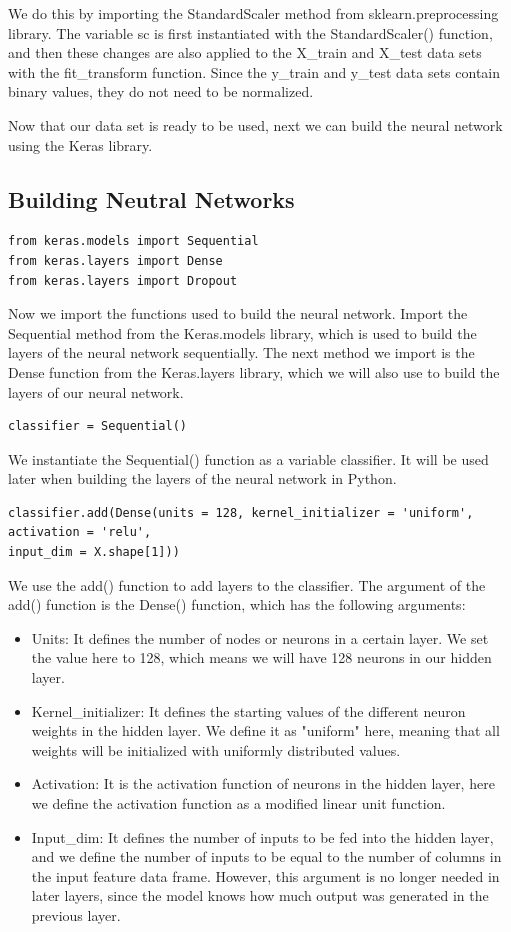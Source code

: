 \documentclass{article}
\begin{document}
We do this by importing the StandardScaler method from sklearn.preprocessing library. The variable sc is first instantiated with the StandardScaler() function, and then these changes are also applied to the X\_train and X\_test data sets with the fit\_transform function. Since the y\_train and y\_test data sets contain binary values, they do not need to be normalized.

Now that our data set is ready to be used, next we can build the neural network using the Keras library.

\subsection{Building Neutral Networks}
\begin{verbatim}
from keras.models import Sequential
from keras.layers import Dense
from keras.layers import Dropout
\end{verbatim}
Now we import the functions used to build the neural network. Import the Sequential method from the Keras.models library, which is used to build the layers of the neural network sequentially. The next method we import is the Dense function from the Keras.layers library, which we will also use to build the layers of our neural network.
\begin{verbatim}
classifier = Sequential()
\end{verbatim}
We instantiate the Sequential() function as a variable classifier. It will be used later when building the layers of the neural network in Python.
\begin{verbatim}
classifier.add(Dense(units = 128, kernel_initializer = 'uniform', activation = 'relu',
input_dim = X.shape[1]))
\end{verbatim}
We use the add() function to add layers to the classifier. The argument of the add() function is the Dense() function, which has the following arguments:
\begin{itemize}
    \item Units: It defines the number of nodes or neurons in a certain layer. We set the value here to 128, which means we will have 128 neurons in our hidden layer.
    \item Kernel\_initializer: It defines the starting values of the different neuron weights in the hidden layer. We define it as "uniform" here, meaning that all weights will be initialized with uniformly distributed values.
    \item Activation: It is the activation function of neurons in the hidden layer, here we define the activation function as a modified linear unit function.
    \item Input\_dim: It defines the number of inputs to be fed into the hidden layer, and we define the number of inputs to be equal to the number of columns in the input feature data frame. However, this argument is no longer needed in later layers, since the model knows how much output was generated in the previous layer.
\end{itemize}
\end{document}
